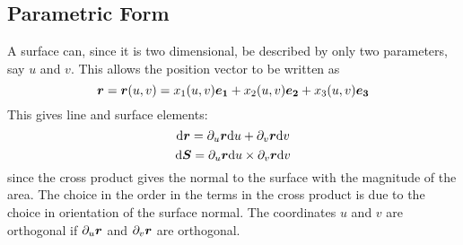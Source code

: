 \documentclass{article}
\begin{document}
    \subsection{Parametric Form}
    A surface can, since it is two dimensional, be described by only two parameters, say \(u\) and \(v\).
    This allows the position vector to be written as
    \[\bm{r} = \bm{r}(u, v) = x_1(u, v)\bm{e_{1}} + x_2(u, v)\bm{e_{2}} + x_3(u, v)\bm{e_{3}}\]
    This gives line and surface elements:
    \[\dd \bm{r} = \partial_u\bm{r}\dd u + \partial_v\bm{r}\dd v\]
    \[\dd\bm{S} = \partial_u\bm{r}\dd u\times \partial_v\bm{r}\dd v\]
    since the cross product gives the normal to the surface with the magnitude of the area.
    The choice in the order in the terms in the cross product is due to the choice in orientation of the surface normal.
    The coordinates \(u\) and \(v\) are orthogonal if \(\partial_u\bm{r}\) and \(\partial_v\bm{r}\) are orthogonal.
    
\end{document}
